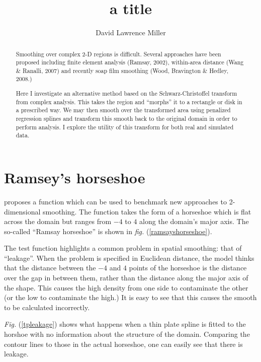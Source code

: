 \documentclass[a4paper,10pt]{amsart}
\title{a title}
\author{David Lawrence Miller}
\newcommand{\fig}[1]{\emph{fig.} (\ref{#1})}
\newcommand{\Fig}[1]{\emph{Fig.} (\ref{#1})}
\begin{document}
\begin{abstract}
Smoothing over complex 2-D regions is difficult. Several approaches have been proposed including finite element analysis (Ramsay, 2002), within-area distance (Wang \& Ranalli, 2007) and recently soap film smoothing (Wood, Bravington \& Hedley, 2008.)

Here I investigate an alternative method based on the Schwarz-Christoffel transform from complex analysis. This takes the region and ``morphs'' it to a rectangle or disk in a prescribed way. We may then smooth over the transformed area using penalized regression splines and transform this smooth back to the original domain in order to perform analysis. I explore the utility of this transform for both real and simulated data.
\end{abstract}


\newtheorem{thm}{Theorem}[section]

\newtheorem{defn}{Definition}[section]

\maketitle



\section{Ramsey's horseshoe}

\cite{ramsay} proposes a function which can be used to benchmark new approaches to 2-dimensional smoothing. The function takes the form of a horseshoe which is flat across the domain but ranges from $-4$ to $4$ along the domain's major axis. The so-called ``Ramsay horseshoe'' is shown in \fig{ramsayshorseshoe}.

The test function highlights a common problem in spatial smoothing: that of ``leakage''. When the problem is specified in Euclidean distance, the model thinks that the distance between the $-4$ and $4$ points of the horseshoe is the distance over the gap in between them, rather than the distance along the major axis of the shape. This causes the high density from one side to contaminate the other (or the low to contaminate the high.) It is easy to see that this causes the smooth to be calculated incorrectly.

\Fig{tpleakage} shows what happens when a thin plate spline is fitted to the horshoe with no information about the structure of the domain. Comparing the contour lines to those in the actual horseshoe, one can easily see that there is leakage.
\end{document}
